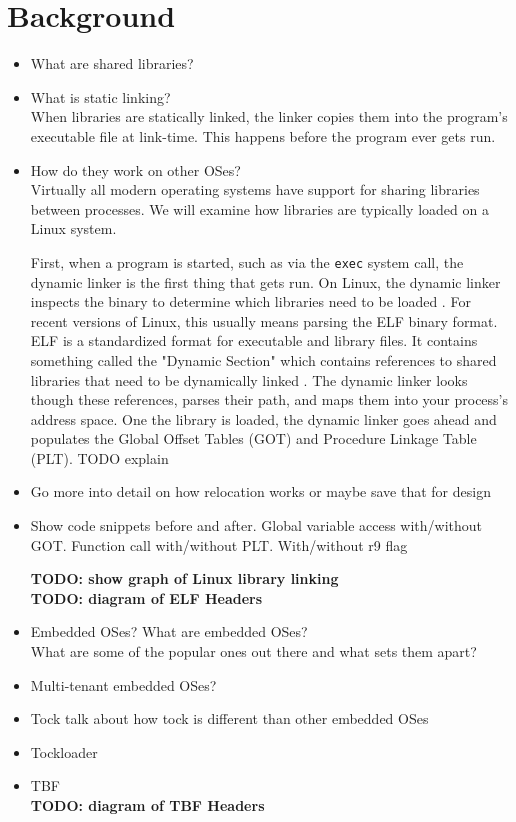 \documentclass{article}
\begin{document}
\section*{Background}

\begin{itemize}
    \item What are shared libraries?
    \item What is static linking? \\
        When libraries are statically linked, the linker copies them into the program's executable file at link-time. This happens before the program ever gets run.
    \item How do they work on other OSes? \\
        Virtually all modern operating systems have support for sharing libraries between processes. We will examine how libraries are typically loaded on a Linux system.

        First, when a program is started, such as via the \texttt{exec} system call, the dynamic linker is the first thing that gets run. On Linux, the dynamic linker inspects the binary to determine which libraries need to be loaded \cite{ld.so}. For recent versions of Linux, this usually means parsing the ELF binary format. ELF is a standardized format for executable and library files. It contains something called the "Dynamic Section" which contains references to shared libraries that need to be dynamically linked \cite{ELF pg 78}. The dynamic linker looks though these references, parses their path, and maps them into your process's address space. One the library is loaded, the dynamic linker goes ahead and populates the Global Offset Tables (GOT) and Procedure Linkage Table (PLT). TODO explain
    \item Go more into detail on how relocation works or maybe save that for design 

    \item Show code snippets before and after. Global variable access with/without GOT. Function call with/without PLT. With/without r9 flag 


        \textbf{TODO: show graph of Linux library linking} \\
        \textbf{TODO: diagram of ELF Headers}
    \item Embedded OSes?
        What are embedded OSes? \\
        What are some of the popular ones out there and what sets them apart? \\
    \item Multi-tenant embedded OSes?
    \item Tock
        talk about how tock is different than other embedded OSes
    \item Tockloader
    \item TBF \\
        \textbf{TODO: diagram of TBF Headers}
\end{itemize}
\end{document}
